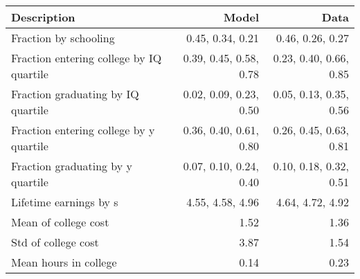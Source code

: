 \begin{tabular}{lrr}
\hline
Description & Model  & Data  \\
\hline
Fraction by schooling & 0.45, 0.34, 0.21  & 0.46, 0.26, 0.27  \\
Fraction entering college by IQ quartile & 0.39, 0.45, 0.58, 0.78  & 0.23, 0.40, 0.66, 0.85  \\
Fraction graduating by IQ quartile & 0.02, 0.09, 0.23, 0.50  & 0.05, 0.13, 0.35, 0.56  \\
Fraction entering college by y quartile & 0.36, 0.40, 0.61, 0.80  & 0.26, 0.45, 0.63, 0.81  \\
Fraction graduating by y quartile & 0.07, 0.10, 0.24, 0.40  & 0.10, 0.18, 0.32, 0.51  \\
Lifetime earnings by s & 4.55, 4.58, 4.96  & 4.64, 4.72, 4.92  \\
Mean of college cost & 1.52  & 1.36  \\
Std of college cost & 3.87  & 1.54  \\
Mean hours in college & 0.14  & 0.23  \\
\hline
\end{tabular}%
